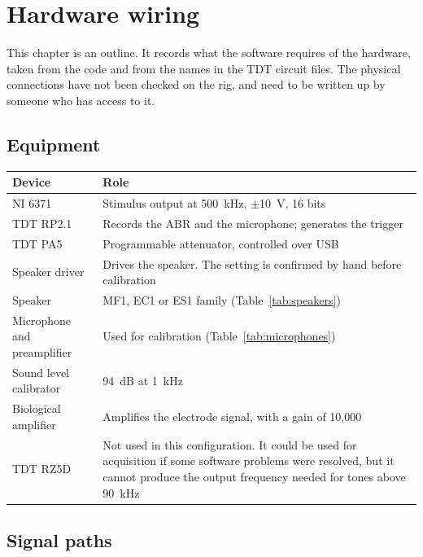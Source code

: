 \chapter{Hardware wiring}
\label{ch:wiring}

This chapter is an outline. It records what the software requires of the hardware,
taken from the code and from the names in the TDT circuit files. The physical
connections have not been checked on the rig, and need to be written up by someone who
has access to it.

\section{Equipment}

\begin{center}
\begin{tabularx}{\textwidth}{@{}lX@{}}
\toprule
Device & Role \\
\midrule
NI 6371\index{NI 6371} & Stimulus output at 500~kHz, $\pm$10~V, 16 bits \\
TDT RP2.1\index{RP2.1} & Records the ABR and the microphone; generates the trigger \\
TDT PA5\index{PA5} & Programmable attenuator, controlled over USB \\
Speaker driver & Drives the speaker. The setting is confirmed by hand before
  calibration \\
Speaker & MF1, EC1 or ES1 family (Table~\ref{tab:speakers}) \\
Microphone and preamplifier & Used for calibration (Table~\ref{tab:microphones}) \\
Sound level calibrator & 94~dB at 1~kHz \\
Biological amplifier & Amplifies the electrode signal, with a gain of 10,000 \\
TDT RZ5D\index{RZ5D} & Not used in this configuration. It could be used for acquisition
  if some software problems were resolved, but it cannot produce the output frequency
  needed for tones above 90~kHz \\
\bottomrule
\end{tabularx}
\end{center}


\section{Signal paths}

